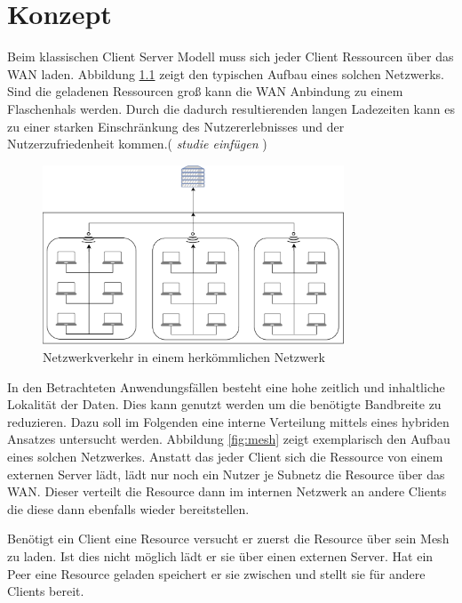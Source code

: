 \chapter{Konzept}\label{ch:concept}
%
Beim klassischen Client Server Modell muss sich jeder Client Ressourcen über das WAN laden. Abbildung \ref{fig:school} zeigt den typischen Aufbau eines solchen Netzwerks. Sind die geladenen Ressourcen groß kann die WAN Anbindung zu einem Flaschenhals werden. Durch die dadurch resultierenden langen Ladezeiten kann es zu einer starken Einschränkung des Nutzererlebnisses und der Nutzerzufriedenheit kommen.(\emph{\color{red} studie einfügen })

\begin{figure}[!h]
	\centering
	\includegraphics[width=0.8\textwidth]{figures/network_current}
	\caption[A Figure Short-Title]{Netzwerkverkehr in einem herkömmlichen Netzwerk}
	\label{fig:school}
\end{figure}

In den Betrachteten Anwendungsfällen besteht eine hohe zeitlich und inhaltliche Lokalität der Daten. Dies kann genutzt werden um die benötigte Bandbreite zu reduzieren. Dazu soll im Folgenden eine interne Verteilung mittels eines hybriden \pTp Ansatzes untersucht werden. Abbildung \ref{fig:mesh} zeigt exemplarisch den Aufbau eines solchen Netzwerkes. Anstatt das jeder Client sich die Ressource von einem externen Server lädt, lädt nur noch ein Nutzer je Subnetz die Resource über das WAN. Dieser verteilt die Resource dann im internen Netzwerk an andere Clients die diese dann ebenfalls wieder bereitstellen.

Benötigt ein Client eine Resource versucht er zuerst die Resource über sein \pTp Mesh zu laden. Ist dies nicht möglich lädt er sie über einen externen Server. Hat ein Peer eine Resource geladen speichert er sie zwischen und stellt sie für andere Clients bereit.

